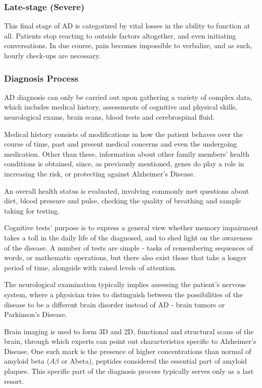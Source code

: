 \documentclass[a4paper, 12pt]{article}
\begin{document}
\subsubsection*{Late-stage (Severe)} %
This final stage of AD is categorized by vital losses in the ability to function at all. Patients stop reacting to outside factors
altogether, and even initiating conversations. In due course, pain becomes impossible to verbalize, and as such, hourly check-ups
are necessary. \cite{AA1}

\subsubsection{Diagnosis Process} %
AD diagnosis can only be carried out upon gathering a variety of complex data, which includes medical history, assessments of
cognitive and physical skills, neurological exams, brain scans, blood tests and cerebrospinal fluid.

Medical history consists of modifications in how the patient behaves over the course of time, past and present medical concerns
and even the undergoing medication. Other than these, information about other family members' health conditions is obtained, since,
as previously mentioned, genes do play a role in increasing the risk, or protecting against Alzheimer's Disease.

An overall health status is evaluated, involving commonly met questions about diet, blood pressure and pulse, checking
the quality of breathing and sample taking for testing.

Cognitive tests' purpose is to express a general view whether memory impairment takes a toll in the daily life of the diagnosed,
and to shed light on the awareness of the disease. A number of tests are simple - tasks of remembering sequences of words, or
mathematic operations, but there also exist those that take a longer period of time, alongside with raised levels of attention.

The neurological examination typically implies assessing the patient's nervous system, where a physician tries to distinguish
between the possibilities of the disease to be a different brain disorder instead of AD - brain tumors or Parkinson's Disease.

Brain imaging is used to form 3D and 2D, functional and structural scans of the brain, through which experts can point out
characteristics specific to Alzheimer's Disease. One such mark is the presence of higher concentrations than normal of amyloid
beta ($A\beta $ or Abeta), peptides considered the essential part of amyloid plaques. This specific part of the diagnosis
process typically serves only as a last resort. \\
\cite{AA2}
\end{document}
